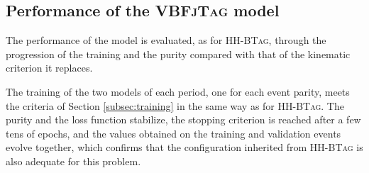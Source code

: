 %
%

%



\subsection{Performance of the \textsc{VBFjTag} model} 
\label{subsec:vbf_performance}
%
The performance of the model is evaluated, as for \textsc{HH-BTag}, through the progression of the training and the purity compared with that of the kinematic criterion it replaces.


The training of the two models of each period, one for each event parity, meets the criteria of Section \ref{subsec:training} in the same way as for \textsc{HH-BTag}. The purity and the loss function stabilize, the stopping criterion is reached after a few tens of epochs, and the values obtained on the training and validation events evolve together, which confirms that the configuration inherited from \textsc{HH-BTag} is also adequate for this problem.\medskip


